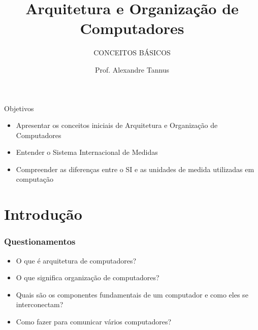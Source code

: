 \documentclass[aspectratio=169,
				xcolor=table]{beamer}
\institute[]{\uppercase{Engenharia de Software}}
\title[]{Arquitetura e Organização de Computadores}
\subtitle[]{\uppercase{Conceitos Básicos}}
\author[]{Prof. Alexandre Tannus}
\date{}
\begin{document}
	\begin{frame}
		\titlepage
	\end{frame}
	
	\begin{frame}{Objetivos}
		\begin{itemize}
			\item Apresentar os conceitos iniciais de Arquitetura e Organização de Computadores
			\vspace{1em}
			\item Entender o Sistema Internacional de Medidas
			\vspace{1em}
			\item Compreender as diferenças entre o SI e as unidades de medida utilizadas em computação
		\end{itemize}
	\end{frame}
	

	\begin{frame}
		\tableofcontents
	\end{frame}	
	
	\section{Introdução}
	\begin{frame}
		\frametitle{Questionamentos}
		\begin{itemize}
			\item O que é arquitetura de computadores?
			\vspace{1em}
			\item O que significa organização de computadores?
			\vspace{1em}
			\item Quais são os componentes fundamentais de um computador e como eles se interconectam?
			\vspace{1em}
			\item Como fazer para comunicar vários computadores?
		\end{itemize}
	\end{frame}
	
\end{document}
